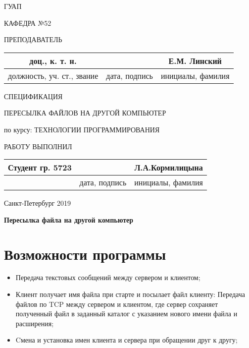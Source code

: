 \documentclass[12pt,a4paper]{article}
\begin{document}
\thispagestyle{empty}
\begin{center}
ГУАП

КАФЕДРА №52
\end{center}

\vspace{30mm}
ПРЕПОДАВАТЕЛЬ

\begin{tabular}{ |c|c|c| }
\hline
доц., к. т. н. & & Е.М. Линский \\\hline
должность, уч. ст., звание & дата, подпись & инициалы, фамилия \\\hline
\end{tabular}

\vspace{30mm}
\begin{center}
СПЕЦИФИКАЦИЯ

ПЕРЕСЫЛКА ФАЙЛОВ НА ДРУГОЙ КОМПЬЮТЕР
\end{center}

\vspace{10mm}
по курсу: ТЕХНОЛОГИИ ПРОГРАММИРОВАНИЯ

\vspace{50mm}
\hspace{8mm}РАБОТУ ВЫПОЛНИЛ
\begin{center}
\begin{tabular}{ |c|c|c| }
\hline
Студент гр. 5723 & & Л.А.Кормилицына \\\hline
& дата, подпись & инициалы, фамилия \\
\hline
\end{tabular}
\vspace{15mm}

Санкт-Петербург 2019
\end{center}

\newpage
\begin{center}
\Large{\bf Пересылка файла на другой компьютер }
\end{center}
\setcounter{page}{2}

\section*{Возможности программы}
\begin{itemize}
\item Передача текстовых сообщений между сервером и клиентом;
\item Клиент получает имя файла при старте и посылает файл клиенту:
Передача файлов по TCP между сервером и клиентом, где сервер сохраняет полученный файл в заданный каталог с указанием нового имени файла и расширения;
\item Cмена и установка имен клиента и сервера при обращении друг к
другу;

\end{itemize}
\newpage
\end{document}
